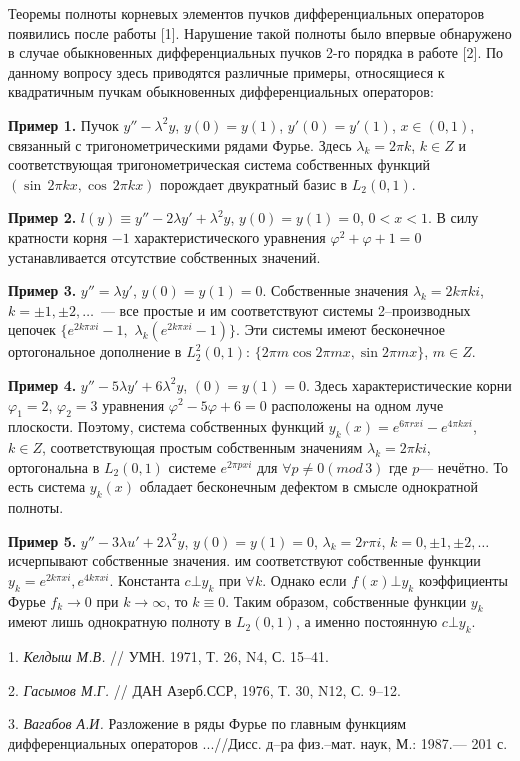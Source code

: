 


\vzmscaption

Теоремы полноты корневых элементов пучков дифференциальных операторов появились после работы  [1]. Нарушение такой полноты было впервые обнаружено в случае обыкновенных дифференциальных пучков 2-го порядка в работе [2]. По данному вопросу здесь приводятся различные примеры, относящиеся к квадратичным пучкам обыкновенных дифференциальных операторов:

{\bf Пример 1.} Пучок $y''-\lambda^2y$, $y(0)=y(1)$, $y'(0)=y'(1)$, $x\in(0,1)$, связанный с тригонометрическими рядами Фурье. Здесь $\lambda_k=2\pi k$, $k\in Z$ и соответствующая тригонометрическая система собственных функций $(\sin\,2\pi k x,\cos\,2\pi k x)$ порождает двукратный базис в $L_2(0,1)$.

{\bf Пример 2.} $l(y)\equiv y''-2\lambda y'+\lambda^2y$, $y(0)=y(1)=0$, $0<x<1$. В силу кратности корня $-1$ характеристического уравнения $\varphi^2+\varphi+1=0$ устанавливается отсутствие  собственных значений.

{\bf Пример 3.}
$y''=\lambda y'$, $y(0)=y(1)=0$.
Собственные значения $\lambda_k=2k\pi k i$, $k=\pm1,\pm2,\dots$~--- все простые
и им соответствуют системы 2--производных цепочек $\{e^{2k\pi xi}-1,$ $\lambda_k(e^{2k\pi xi}-1)\}$.
Эти системы имеют бесконечное ортогональное дополнение в
$L_2^2(0,1)$: $\{2\pi m\cos2\pi mx,\sin 2\pi mx\}$, $m\in Z$.

{\bf Пример 4.} $y''-5\lambda y'+6\lambda^2y$, $(0)=y(1)=0$. Здесь характеристические корни $\varphi_1=2$, $\varphi_2=3$ уравнения $\varphi^2-5\varphi+6=0$ расположены на одном луче плоскости. Поэтому, система собственных функций $y_k(x)=e^{6\pi r xi}-e^{4\pi k xi}$, $k\in Z$, соответствующая простым собственным значениям $\lambda_k=2\pi k i$, ортогональна в $L_2(0,1)$ системе $e^{2\pi pxi}$ для $\forall p\neq 0(mod\,3)$ где $p$--- нечётно. То есть система $y_k(x)$ обладает бесконечным дефектом в смысле однократной полноты.

{\bf Пример 5.} $y''-3\lambda u'+2\lambda^2y$, $y(0)=y(1)=0$, $\lambda_k=2r\pi i$, $k=0,\pm1,\pm2,\dots$ исчерпывают собственные значения. им соответствуют собственные функции $y_k=e^{2k\pi xi},e^{4k\pi xi}$. Константа $c\bot y_k$ при $\forall k$. Однако если $f(x)\bot y_k$ коэффициенты Фурье $f_k\to0$ при $k\to\infty$, то $k\equiv0$. Таким образом, собственные функции $y_k$ имеют лишь однократную полноту в $L_2(0,1)$, а именно постоянную $c\bot y_k$.

\litlist

1. {\it Келдыш М.В.} // УМН. 1971, Т. 26, N4, С. 15--41.

2. {\it Гасымов М.Г.} // ДАН Азерб.ССР, 1976, Т. 30, N12, С. 9--12.

3. {\it Вагабов А.И.} Разложение в ряды Фурье по главным функциям дифференциальных операторов ...//Дисс. д--ра физ.--мат. наук, М.: 1987.--- 201 с.
